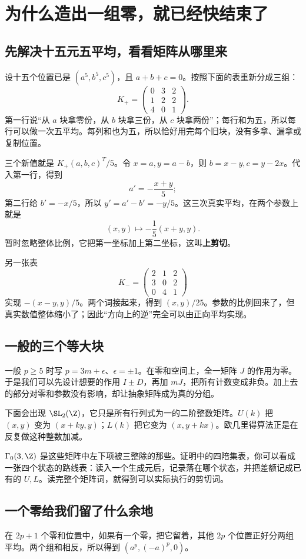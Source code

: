 \chapter{为什么造出一组零，就已经快结束了}\label{sec:blocks}
\section{先解决十五元五平均，看看矩阵从哪里来}
设十五个位置已是 $(a^5,b^5,c^5)$，且 $a+b+c=0$。按照下面的表重新分成三组：
\[
K_+=\begin{pmatrix}0&3&2\\1&2&2\\4&0&1\end{pmatrix}.
\]
第一行说“从 $a$ 块拿零份，从 $b$ 块拿三份，从 $c$ 块拿两份”；每行和为五，所以每行可以做一次五平均。每列和也为五，所以恰好用完每个旧块，没有多拿、漏拿或复制位置。

三个新值就是 $K_+(a,b,c)^T/5$。令 $x=a,y=a-b$，则 $b=x-y,c=y-2x$。代入第一行，得到
\[a'=-\frac{x+y}{5};
\]
第二行给 $b'=-x/5$，所以 $y'=a'-b'=-y/5$。这三次真实平均，在两个参数上就是
\[(x,y)\longmapsto-\frac15(x+y,y).
\]
暂时忽略整体比例，它把第一坐标加上第二坐标，这叫\textbf{上剪切}。

另一张表
\[K_-=\begin{pmatrix}2&1&2\\3&0&2\\0&4&1\end{pmatrix}
\]
实现 $-(x-y,y)/5$。两个词接起来，得到 $(x,y)/25$。参数的比例回来了，但真实数值整体缩小了；因此“方向上的逆”完全可以由正向平均实现。

\section{一般的三个等大块}
一般 $p\ge5$ 时写 $p=3m+\epsilon$、$\epsilon=\pm1$。在零和空间上，全一矩阵 $J$ 的作用为零。于是我们可以先设计想要的作用 $I\pm D$，再加 $mJ$，把所有计数变成非负。加上去的部分对零和参数没有影响，却让抽象矩阵成为真的分组。

下面会出现 $\SL_2(\Z)$，它只是所有行列式为一的二阶整数矩阵。$U(k)$ 把 $(x,y)$ 变为 $(x+ky,y)$；$L(k)$ 把它变为 $(x,y+kx)$。欧几里得算法正是在反复做这种整数加减。

$\Gamma_0(3,\Z)$ 是这些矩阵中左下项被三整除的那些。证明中的四陪集表，你可以看成一张四个状态的路线表：读入一个生成元后，记录落在哪个状态，并把差额记成已有的 $U,L$。读完整个矩阵词，就得到可以实际执行的剪切词。

\section{一个零给我们留了什么余地}
在 $2p+1$ 个零和位置中，如果有一个零，把它留着，其他 $2p$ 个位置正好分两组平均。两个组和相反，所以得到 $(a^p,(-a)^p,0)$。

